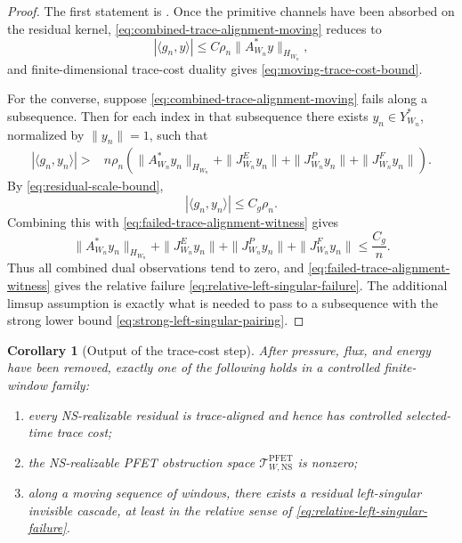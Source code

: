 \documentclass[11pt]{article}
\numberwithin{equation}{section}
\theoremstyle{plain}
\newtheorem{corollary}[theorem]{Corollary}
\theoremstyle{definition}
\theoremstyle{remark}
\newcommand{\NS}{\mathrm{NS}}
\newcommand{\PFET}{\mathrm{PFET}}
\begin{document}
\begin{proof}
The first statement is .  Once the
primitive channels have been absorbed on the residual kernel,
\eqref{eq:combined-trace-alignment-moving} reduces to
\[
        |\langle g_n,y\rangle|
        \le
        C\rho_n\|A_{W_n}^*y\|_{H_{W_n}},
\]
and finite-dimensional trace-cost duality gives
\eqref{eq:moving-trace-cost-bound}.

For the converse, suppose \eqref{eq:combined-trace-alignment-moving} fails
along a subsequence.  Then for each index in that subsequence there exists
\(y_n\in Y_{W_n}^*\), normalized by \(\|y_n\|=1\), such that
\begin{align}
        |\langle g_n,y_n\rangle|
        >{}&
        n\rho_n
        \left(
            \|A_{W_n}^*y_n\|_{H_{W_n}}
            +
            \|J^E_{W_n}y_n\|
            +
            \|J^P_{W_n}y_n\|
            +
            \|J^F_{W_n}y_n\|
        \right).
        \label{eq:failed-trace-alignment-witness}
\end{align}
By \eqref{eq:residual-scale-bound},
\[
        |\langle g_n,y_n\rangle|\le C_g\rho_n.
\]
Combining this with \eqref{eq:failed-trace-alignment-witness} gives
\[
        \|A_{W_n}^*y_n\|_{H_{W_n}}
        +
        \|J^E_{W_n}y_n\|
        +
        \|J^P_{W_n}y_n\|
        +
        \|J^F_{W_n}y_n\|
        \le
        \frac{C_g}{n}.
\]
Thus all combined dual observations tend to zero, and
\eqref{eq:failed-trace-alignment-witness} gives the relative failure
\eqref{eq:relative-left-singular-failure}.  The additional limsup assumption is
exactly what is needed to pass to a subsequence with the strong lower bound
\eqref{eq:strong-left-singular-pairing}.
\end{proof}

\begin{corollary}[Output of the trace-cost step]
\label{cor:trace-cost-step-output}
After pressure, flux, and energy have been removed, exactly one of the following
holds in a controlled finite-window family:

\begin{enumerate}
\item every NS-realizable residual is trace-aligned and hence has controlled
selected-time trace cost;

\item the NS-realizable PFET obstruction space
\(\mathcal T_{W,\NS}^{\PFET}\) is nonzero;

\item along a moving sequence of windows, there exists a residual left-singular
invisible cascade, at least in the relative sense of
\eqref{eq:relative-left-singular-failure}.
\end{enumerate}
\end{corollary}
\end{document}
